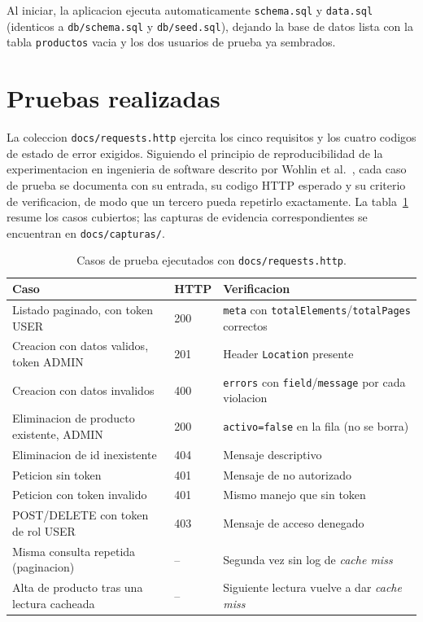 \documentclass[11pt,a4paper]{article}
\begin{document}
Al iniciar, la aplicacion ejecuta automaticamente \texttt{schema.sql} y
\texttt{data.sql} (identicos a \texttt{db/schema.sql} y
\texttt{db/seed.sql}), dejando la base de datos lista con la tabla
\texttt{productos} vacia y los dos usuarios de prueba ya sembrados.

\section{Pruebas realizadas}

La coleccion \texttt{docs/requests.http} ejercita los cinco requisitos y
los cuatro codigos de estado de error exigidos. Siguiendo el principio de
reproducibilidad de la experimentacion en ingenieria de software descrito
por Wohlin et al.~\cite{wohlin2012}, cada caso de prueba se documenta con
su entrada, su codigo HTTP esperado y su criterio de verificacion, de modo
que un tercero pueda repetirlo exactamente. La tabla~\ref{tab:pruebas}
resume los casos cubiertos; las capturas de evidencia correspondientes se
encuentran en \texttt{docs/capturas/}.

\begin{table}[h]
    \centering
    \begin{tabular}{@{}p{5.5cm}p{2cm}p{6.5cm}@{}}
        \toprule
        \textbf{Caso} & \textbf{HTTP} & \textbf{Verificacion} \\
        \midrule
        Listado paginado, con token USER          & 200 & \texttt{meta} con \texttt{totalElements}/\texttt{totalPages} correctos \\
        Creacion con datos validos, token ADMIN    & 201 & Header \texttt{Location} presente \\
        Creacion con datos invalidos               & 400 & \texttt{errors} con \texttt{field}/\texttt{message} por cada violacion \\
        Eliminacion de producto existente, ADMIN    & 200 & \texttt{activo=false} en la fila (no se borra) \\
        Eliminacion de id inexistente                & 404 & Mensaje descriptivo \\
        Peticion sin token                          & 401 & Mensaje de no autorizado \\
        Peticion con token invalido                 & 401 & Mismo manejo que sin token \\
        POST/DELETE con token de rol USER            & 403 & Mensaje de acceso denegado \\
        Misma consulta repetida (paginacion)         & --  & Segunda vez sin log de \emph{cache miss} \\
        Alta de producto tras una lectura cacheada   & --  & Siguiente lectura vuelve a dar \emph{cache miss} \\
        \bottomrule
    \end{tabular}
    \caption{Casos de prueba ejecutados con \texttt{docs/requests.http}.}
    \label{tab:pruebas}
\end{table}
\end{document}
